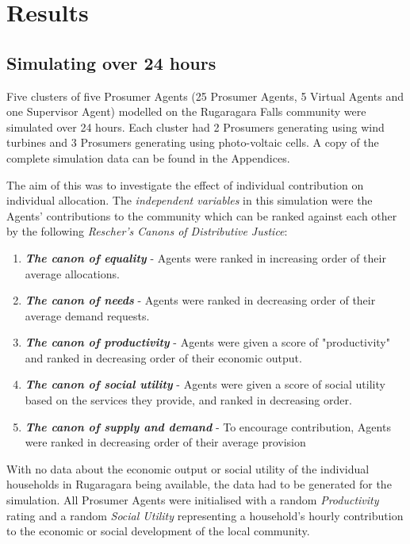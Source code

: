 \chapter{Results}
\label{Results}

\section*{Simulating over 24 hours}
Five clusters of five Prosumer Agents (25 Prosumer Agents, 5 Virtual Agents and one Supervisor Agent) modelled on the Rugaragara Falls community were simulated over 24 hours. Each cluster had 2 Prosumers generating using wind turbines and 3 Prosumers generating using photo-voltaic cells. A copy of the complete simulation data can be found in the Appendices.

The aim of this was to investigate the effect of individual contribution on individual allocation. The \textit{independent variables} in this simulation were the Agents' contributions to the community which can be ranked against each other by the following \textit{Rescher's Canons of Distributive Justice}:
\begin{enumerate}
	\item \textbf{\textit{The canon of equality}} - Agents were ranked in increasing order of their average allocations.
	\item \textbf{\textit{The canon of needs}} - Agents were ranked in decreasing order of their average demand requests.
	\item \textbf{\textit{The canon of productivity}} - Agents were given a score of "productivity" and ranked in decreasing order of their economic output.
	\item \textbf{\textit{The canon of social utility}} - Agents were given a score of social utility based on the services they provide, and ranked in decreasing order.
	\item \textbf{\textit{The canon of supply and demand}} - To encourage contribution, Agents were ranked in decreasing order of their average provision
\end{enumerate}

With no data about the economic output or social utility of the individual households in Rugaragara being available, the data had to be generated for the simulation. All Prosumer Agents were initialised with a random \textit{Productivity} rating and a random \textit{Social Utility} representing a household's hourly contribution to the economic or social development of the local community.

